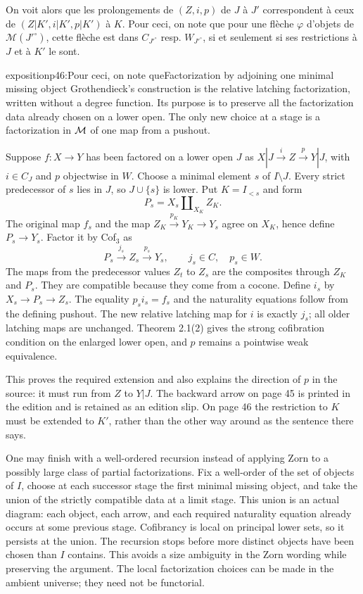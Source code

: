 On voit alors que les prolongements de $(Z,i,p)$ de $J$ à $J'$ correspondent à ceux de $(Z|K',i|K',p|K')$ à $K$. Pour ceci, on note que pour une flèche $\varphi$ d'objets de $\mathcal{M}(J'^\circ)$, cette flèche est dans $C_{J'^\circ}$ resp. $W_{J'^\circ}$, si et seulement si ses restrictions à $J$ et à $K'$ le sont.

\begin{dcomment}{exposition}{p46:Pour ceci, on note que}{Factorization by adjoining one minimal missing object}
Grothendieck's construction is the relative latching factorization, written without a degree function. Its purpose is to preserve all the factorization data already chosen on a lower open. The only new choice at a stage is a factorization in $\mathcal{M}$ of one map from a pushout.

Suppose $f:X\to Y$ has been factored on a lower open $J$ as $X|J\xrightarrow{i}Z\xrightarrow{p}Y|J$, with $i\in C_J$ and $p$ objectwise in $W$. Choose a minimal element $s$ of $I\setminus J$. Every strict predecessor of $s$ lies in $J$, so $J\cup\{s\}$ is lower. Put $K=I_{<s}$ and form
\[
 P_s=X_s\amalg_{X_K}Z_K.
\]
The original map $f_s$ and the map $Z_K\xrightarrow{p_K}Y_K\to Y_s$ agree on $X_K$, hence define $P_s\to Y_s$. Factor it by Cof$_3$ as
\[
 P_s\xrightarrow{j_s}Z_s\xrightarrow{p_s}Y_s,
 \qquad j_s\in C,\quad p_s\in W.
\]
The maps from the predecessor values $Z_t$ to $Z_s$ are the composites through $Z_K$ and $P_s$. They are compatible because they come from a cocone. Define $i_s$ by $X_s\to P_s\to Z_s$. The equality $p_si_s=f_s$ and the naturality equations follow from the defining pushout. The new relative latching map for $i$ is exactly $j_s$; all older latching maps are unchanged. Theorem 2.1(2) gives the strong cofibration condition on the enlarged lower open, and $p$ remains a pointwise weak equivalence.

This proves the required extension and also explains the direction of $p$ in the source: it must run from $Z$ to $Y|J$. The backward arrow on page 45 is printed in the edition and is retained as an edition slip. On page 46 the restriction to $K$ must be extended to $K'$, rather than the other way around as the sentence there says.

One may finish with a well-ordered recursion instead of applying Zorn to a possibly large class of partial factorizations. Fix a well-order of the set of objects of $I$, choose at each successor stage the first minimal missing object, and take the union of the strictly compatible data at a limit stage. This union is an actual diagram: each object, each arrow, and each required naturality equation already occurs at some previous stage. Cofibrancy is local on principal lower sets, so it persists at the union. The recursion stops before more distinct objects have been chosen than $I$ contains. This avoids a size ambiguity in the Zorn wording while preserving the argument. The local factorization choices can be made in the ambient universe; they need not be functorial.


\end{dcomment}
